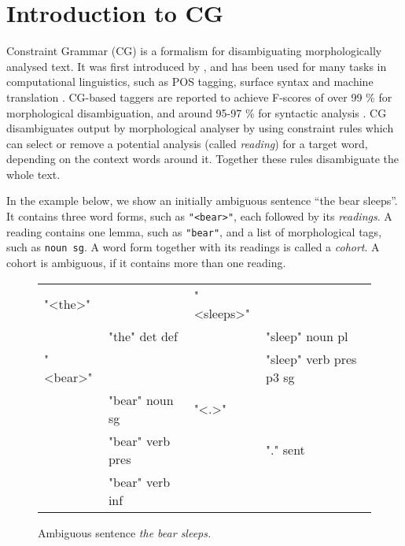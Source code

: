 \def\t#1{\texttt{#1}}

\section{Introduction to CG}
\label{sec:cg-intro}
 

Constraint Grammar (CG) is a formalism for 
disambiguating morphologically analysed text. 
It was first introduced by
\cite{karlsson1995constraint}, and has been used for many tasks in
computational linguistics, such as POS tagging, surface syntax and
machine translation \cite{bick2011}.
CG-based taggers are reported to achieve F-scores of over 99 \% for morphological disambiguation, 
and around 95-97 \% for syntactic analysis \cite{bick2000palavras,bick2003hybridCG_PSG,bick2006spanish}.
CG disambiguates output by morphological analyser by using
constraint rules which can select or remove a potential analysis (called \emph{reading})
for a target word, depending on the context words around it. 
Together these rules disambiguate the whole text.


In the example below, we show an initially ambiguous sentence ``the bear
sleeps''. 
It contains three word forms, such as \t{"<bear>"}, each followed by its \emph{readings}.
A reading contains one lemma, such as \t{"bear"}, and a list of morphological tags, such as \t{noun sg}.
A word form together with its readings is called a \emph{cohort}. A cohort is ambiguous, if it contains more than one reading.

\begin{figure}[h]
\centering
\ttfamily
\begin{tabular}{p{0.6cm} l  p{0.6cm} l}
"<the>"  &                & "<sleeps>"        \\
    & "the" det def       &     & "sleep" noun pl \\
"<bear>" &                &     & "sleep" verb pres p3 sg \\
    & "bear" noun sg      & "<.>"                   \\
    & "bear" verb pres    &     & "." sent          \\
    & "bear" verb inf \\
\end{tabular}
\label{fig:theBearSleeps}
\caption{Ambiguous sentence {\em the bear sleeps.}}
\end{figure}



